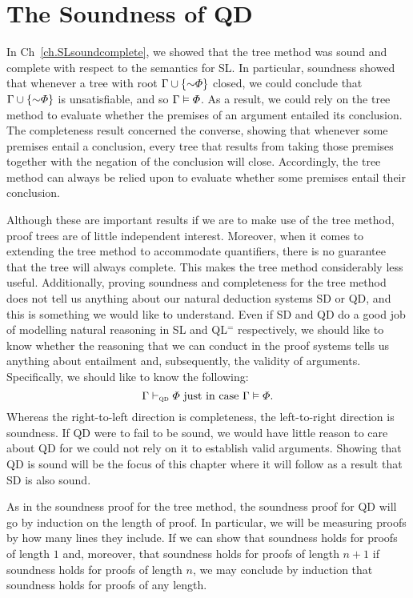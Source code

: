 ﻿%
\chapter{The Soundness of QD}
  \label{ch.SoundQD}

In Ch~\ref{ch.SLsoundcomplete}, we showed that the tree method was sound and complete with respect to the semantics for SL.
In particular, soundness showed that whenever a tree with root $\Gamma\cup\set{\enot\metaA}$ closed, we could conclude that $\Gamma\cup\set{\enot\metaA}$ is unsatisfiable, and so $\Gamma \vDash \varPhi$.
As a result, we could rely on the tree method to evaluate whether the premises of an argument entailed its conclusion.
The completeness result concerned the converse, showing that whenever some premises entail a conclusion, every tree that results from taking those premises together with the negation of the conclusion will close.
Accordingly, the tree method can always be relied upon to evaluate whether some premises entail their conclusion.

Although these are important results if we are to make use of the tree method, proof trees are of little independent interest.
Moreover, when it comes to extending the tree method to accommodate quantifiers, there is no guarantee that the tree will always complete.
This makes the tree method considerably less useful.
Additionally, proving soundness and completeness for the tree method does not tell us anything about our natural deduction systems SD or QD, and this is something we would like to understand.
Even if SD and QD do a good job of modelling natural reasoning in SL and QL$^=$ respectively, we should like to know whether the reasoning that we can conduct in the proof systems tells us anything about entailment and, subsequently, the validity of arguments.
Specifically, we should like to know the following: 
  $$\Gamma \vdash_{\textsc{qd}} \varPhi \text{ just in case } \Gamma \vDash \varPhi.$$
Whereas the right-to-left direction is completeness, the left-to-right direction is soundness.
If QD were to fail to be sound, we would have little reason to care about QD for we could not rely on it to establish valid arguments.
Showing that QD is sound will be the focus of this chapter where it will follow as a result that SD is also sound.

As in the soundness proof for the tree method, the soundness proof for QD will go by induction on the length of proof.
In particular, we will be measuring proofs by how many lines they include.
If we can show that soundness holds for proofs of length $1$ and, moreover, that soundness holds for proofs of length $n+1$ if soundness holds for proofs of length $n$, we may conclude by induction that soundness holds for proofs of any length.




